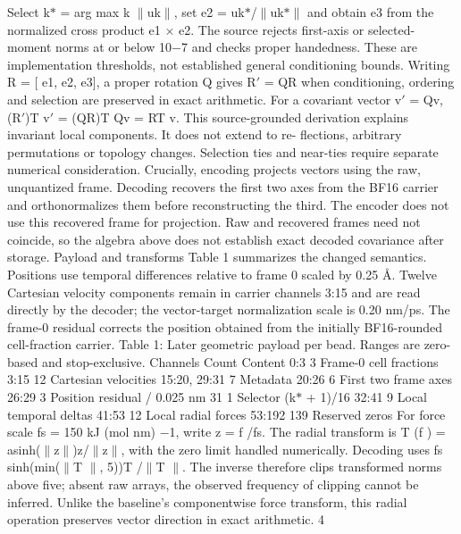 \documentclass[11pt]{article}
\begin{document}
Select k\ensuremath{\ast} = arg max k \ensuremath{\parallel}uk\ensuremath{\parallel}, set e2 = uk\ensuremath{\ast}/\ensuremath{\parallel}uk\ensuremath{\ast}\ensuremath{\parallel} and obtain e3 from the normalized cross product
e1 \ensuremath{\times} e2. The source rejects first-axis or selected-moment norms at or below 10\ensuremath{-}7 and checks proper
handedness. These are implementation thresholds, not established general conditioning bounds.
Writing R = [ e1, e2, e3], a proper rotation Q gives R\ensuremath{\prime} = QR when conditioning, ordering and
selection are preserved in exact arithmetic. For a covariant vector v\ensuremath{\prime} = Qv,
(R\ensuremath{\prime})T v\ensuremath{\prime} = (QR)T Qv = RT v.
This source-grounded derivation explains invariant local components. It does not extend to re-
flections, arbitrary permutations or topology changes. Selection ties and near-ties require separate
numerical consideration.
Crucially, encoding projects vectors using the raw, unquantized frame. Decoding recovers the
first two axes from the BF16 carrier and orthonormalizes them before reconstructing the third.
The encoder does not use this recovered frame for projection. Raw and recovered frames need not
coincide, so the algebra above does not establish exact decoded covariance after storage.
Payload and transforms
Table 1 summarizes the changed semantics. Positions use temporal differences relative to frame 0
scaled by 0.25 Å. Twelve Cartesian velocity components remain in carrier channels 3:15 and are
read directly by the decoder; the vector-target normalization scale is 0.20 nm/ps. The frame-0
residual corrects the position obtained from the initially BF16-rounded cell-fraction carrier.
Table 1: Later geometric payload per bead. Ranges are zero-based and stop-exclusive.
Channels Count Content
0:3 3 Frame-0 cell fractions
3:15 12 Cartesian velocities
15:20, 29:31 7 Metadata
20:26 6 First two frame axes
26:29 3 Position residual / 0.025 nm
31 1 Selector (k\ensuremath{\ast} + 1)/16
32:41 9 Local temporal deltas
41:53 12 Local radial forces
53:192 139 Reserved zeros
For force scale fs = 150 kJ (mol nm) \ensuremath{-}1, write z = f /fs. The radial transform is T (f ) =
asinh(\ensuremath{\parallel}z\ensuremath{\parallel})z/\ensuremath{\parallel}z\ensuremath{\parallel}, with the zero limit handled numerically. Decoding uses
fs sinh(min(\ensuremath{\parallel}T \ensuremath{\parallel}, 5))T /\ensuremath{\parallel}T \ensuremath{\parallel}.
The inverse therefore clips transformed norms above five; absent raw arrays, the observed frequency
of clipping cannot be inferred. Unlike the baseline’s componentwise force transform, this radial
operation preserves vector direction in exact arithmetic.
4
\end{document}
